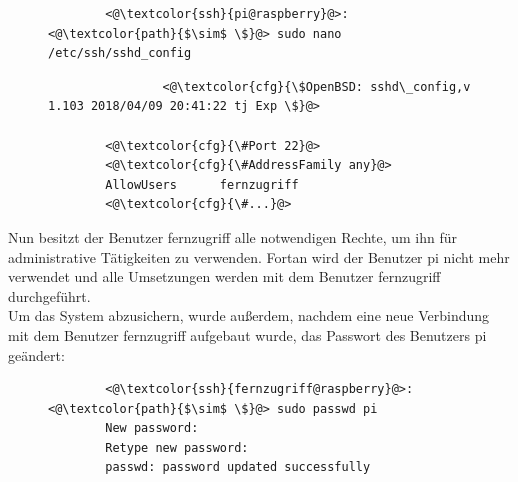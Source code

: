 \documentclass[a4paper, 11pt]{scrartcl}
\begin{document}
\begin{figure}[H]
    \begin{mdframed}[backgroundcolor=bbg]
        \begin{lstlisting}
        <@\textcolor{ssh}{pi@raspberry}@>:<@\textcolor{path}{$\sim$ \$}@> sudo nano /etc/ssh/sshd_config
        \end{lstlisting}
    \end{mdframed}
    \label{lst:nano_sshd_config}
\end{figure}
\begin{figure}[H]
    \begin{mdframed}[backgroundcolor=bbg]
        \begin{lstlisting}
                <@\textcolor{cfg}{\$OpenBSD: sshd\_config,v 1.103 2018/04/09 20:41:22 tj Exp \$}@>    

        <@\textcolor{cfg}{\#Port 22}@>
        <@\textcolor{cfg}{\#AddressFamily any}@>
        AllowUsers      fernzugriff
        <@\textcolor{cfg}{\#...}@>
        \end{lstlisting}
    \end{mdframed}
    \label{lst:fernzugriff_ssh}
\end{figure}
Nun besitzt der Benutzer \glqq fernzugriff\grqq{} alle notwendigen Rechte, um ihn für administrative Tätigkeiten zu verwenden. Fortan wird der Benutzer \glqq pi\grqq{} nicht mehr verwendet und alle
Umsetzungen werden mit dem Benutzer \glqq fernzugriff\grqq{} durchgeführt.
\\
Um das System abzusichern, wurde außerdem, nachdem eine neue Verbindung mit dem Benutzer \glqq fernzugriff\grqq{} aufgebaut wurde, das Passwort des Benutzers \glqq pi\grqq{}
geändert:
\begin{figure}[H]
    \begin{mdframed}[backgroundcolor=bbg]
        \begin{lstlisting}
        <@\textcolor{ssh}{fernzugriff@raspberry}@>:<@\textcolor{path}{$\sim$ \$}@> sudo passwd pi
        New password:
        Retype new password:
        passwd: password updated successfully
        \end{lstlisting}
    \end{mdframed}
    \label{lst:change_pi_passwd}
\end{figure}
\end{document}
